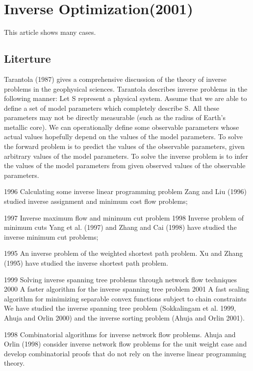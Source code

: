 \documentclass[UTF8]{article}
\begin{document}
\section{Inverse Optimization(2001)}

This article shows many cases.

\subsection{Literture}

Tarantola (1987) gives a comprehensive discussion of the theory of inverse problems in the geophysical sciences.
Tarantola describes inverse problems in the following manner:
Let S represent a physical system. Assume that we are able to define a set of model parameters which completely describe S. All these parameters may not be directly measurable (such as the radius of Earth’s metallic core). We can operationally define some observable parameters whose actual values hopefully depend on the values of the model parameters. To solve the forward problem is to predict the values of the observable parameters, given arbitrary values of the model parameters. To solve the inverse problem is to infer the values of the model parameters from given observed values of the observable parameters.


1996 Calculating some inverse linear programming problem
Zang and Liu (1996) studied inverse assignment and minimum cost flow problems;

1997 Inverse maximum flow and minimum cut problem
1998 Inverse problem of minimum cuts
Yang et al. (1997) and Zhang and Cai (1998) have studied the inverse minimum cut problems;

1995 An inverse problem of the weighted shortest path problem.
Xu and Zhang (1995) have studied the inverse shortest path problem.

1999 Solving inverse spanning tree problems through network flow techniques
2000 A faster algorithm for the inverse spanning tree problem
2001 A fast scaling algorithm for minimizing separable convex functions subject to chain constraints
We have studied the inverse spanning tree problem (Sokkalingam et al. 1999, Ahuja and Orlin 2000) and the inverse sorting problem (Ahuja and Orlin 2001).

1998 Combinatorial algorithms for inverse network flow problems.
Ahuja and Orlin (1998) consider inverse network flow problems for the unit weight case and develop combinatorial proofs that do not rely on the inverse linear programming theory.
\end{document}
